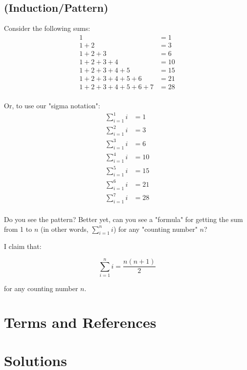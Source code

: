 \documentclass{book}
\begin{document}

\subsection{(Induction/Pattern)}

Consider the following sums:
\begin{align*}
1 &= 1 \\
1 + 2 &= 3 \\
1 + 2 + 3 &= 6 \\
1 + 2 + 3 + 4 &= 10 \\
1 + 2 + 3 + 4 + 5 &= 15 \\
1 + 2 + 3 + 4 + 5 + 6 &= 21 \\
1 + 2 + 3 + 4 + 5 + 6 + 7 &= 28 \\
\end{align*}

Or, to use our "sigma notation":
\begin{align*}
\sum_{i=1}^1 i &= 1 \\
\sum_{i=1}^2 i &= 3 \\
\sum_{i=1}^3 i &= 6 \\
\sum_{i=1}^4 i &= 10 \\
\sum_{i=1}^5 i &= 15 \\
\sum_{i=1}^6 i &= 21 \\
\sum_{i=1}^7 i &= 28 \\
\end{align*}

Do you see the pattern? Better yet, can you see a "formula" for getting the sum from 1 to $n$ (in other words, $\sum_{i=1}^n i$) for any "counting number" $n$?

\newpage

I claim that:

\begin{equation}
\sum_{i=1}^n i = \frac{n(n+1)}{2}
\end{equation}

for any counting number $n$. 




\newpage
\section{Terms and References}

\section{Solutions}
\end{document}
